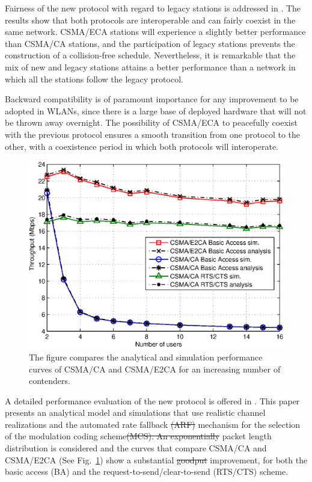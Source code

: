\documentclass[journal]{IEEEtran}
\providecommand{\DIFadd}[1]{{\protect\color{blue}\uwave{#1}}} %
\providecommand{\DIFdel}[1]{{\protect\color{red}\sout{#1}}}                      %
\providecommand{\DIFaddbegin}{} %
\providecommand{\DIFaddend}{} %
\providecommand{\DIFdelbegin}{} %
\providecommand{\DIFdelend}{} %
\begin{document}
Fairness of the new protocol with regard to legacy stations is addressed in \cite{barcelo2010fcc}.
The results show that both protocols are interoperable and can fairly coexist in the same network.
CSMA/ECA stations will experience a slightly better performance than CSMA/CA stations, and the participation of legacy stations prevents the construction of a collision-free schedule.
Nevertheless, it is remarkable that the mix of new and legacy stations attains a better performance than a network in which all the stations follow the legacy protocol.

Backward compatibility is of paramount importance for any improvement to be adopted in WLANs, since there is a large base of deployed hardware that will not be thrown away overnight.
The possibility of CSMA/ECA to peacefully coexist with the previous protocol ensures a smooth transition from one protocol to the other, with a coexistence period in which both protocols will interoperate.

\begin{figure}[!t]
\centering
\includegraphics[width=\linewidth]{figures/performance}
\caption{The figure compares the analytical and simulation performance curves of CSMA/CA and CSMA/E2CA for an increasing number of contenders.}
\label{fig:performance}
\end{figure}

A detailed performance evaluation of the new protocol is offered in \cite{martorell2012pec}.
This paper presents an analytical model and simulations that use realistic channel realizations and the automated rate fallback \DIFdelbegin \DIFdel{(ARF) }\DIFdelend mechanism for the selection of the modulation coding scheme\DIFdelbegin \DIFdel{(MCS).
An exponentially }\DIFdelend \DIFaddbegin \DIFadd{.
An exponential }\DIFaddend packet length distribution is considered and the curves that compare CSMA/CA and CSMA/E2CA (See Fig.~\ref{fig:performance}) show a substantial \DIFdelbegin \DIFdel{goodput }\DIFdelend \DIFaddbegin \DIFadd{throughput }\DIFaddend improvement, for both the basic access (BA) and the request-to-send/clear-to-send (RTS/CTS) scheme.
\end{document}
